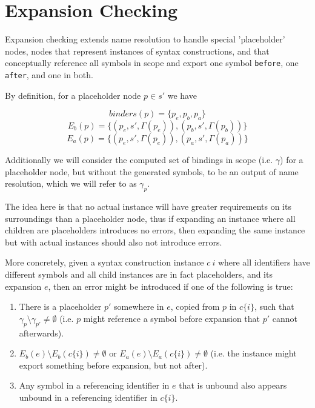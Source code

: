 \documentclass{kththesis}
\begin{document}

\section{Expansion Checking} \label{sec:expansion-checking-formalization}

Expansion checking extends name resolution to handle special 'placeholder' nodes, nodes that represent instances of syntax constructions, and that conceptually reference all symbols in scope and export one symbol \texttt{before}, one \texttt{after}, and one in both.

By definition, for a placeholder node $p \in s'$ we have

$$ binders(p) = \{p_e, p_b, p_a\} $$
$$ E_b(p) = \{(p_e, s', \Gamma(p_e)), (p_b, s', \Gamma(p_b))\} $$
$$ E_a(p) = \{(p_e, s', \Gamma(p_e)), (p_a, s', \Gamma(p_a))\} $$

Additionally we will consider the computed set of bindings in scope (i.e. $\gamma$) for a placeholder node, but without the generated symbols, to be an output of name resolution, which we will refer to as $\gamma_p$.

The idea here is that no actual instance will have greater requirements on its surroundings than a placeholder node, thus if expanding an instance where all children are placeholders introduces no errors, then expanding the same instance but with actual instances should also not introduce errors.

More concretely, given a syntax construction instance $c~i$ where all identifiers have different symbols and all child instances are in fact placeholders, and its expansion $e$, then an error might be introduced if one of the following is true:

\begin{enumerate}
  \item There is a placeholder $p'$ somewhere in $e$, copied from $p$ in $c\{i\}$, such that $\gamma_p \setminus \gamma_{p'} \neq \emptyset$ (i.e. $p$ might reference a symbol before expansion that $p'$ cannot afterwards).
  \item $E_b(e) \setminus E_b(c\{i\}) \neq \emptyset$ or $E_a(e) \setminus E_a(c\{i\}) \neq \emptyset$ (i.e. the instance might export something before expansion, but not after).
  \item Any symbol in a referencing identifier in $e$ that is unbound also appears unbound in a referencing identifier in $c\{i\}$.
\end{enumerate}
\end{document}
